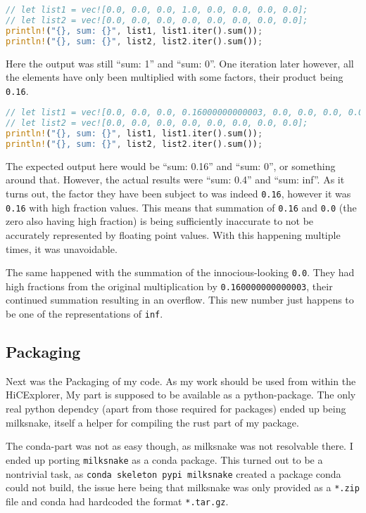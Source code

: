 \vline
\begin{lstlisting}[language=Rust]
// let list1 = vec![0.0, 0.0, 0.0, 1.0, 0.0, 0.0, 0.0, 0.0];
// let list2 = vec![0.0, 0.0, 0.0, 0.0, 0.0, 0.0, 0.0, 0.0];
println!("{}, sum: {}", list1, list1.iter().sum());
println!("{}, sum: {}", list2, list2.iter().sum());
\end{lstlisting}
\vline

Here the output was still ``sum: 1'' and ``sum: 0''. One iteration later however, all the elements have only been multiplied with some factors, their product being \verb|0.16|.

\vline
\begin{lstlisting}[language=Rust]
// let list1 = vec![0.0, 0.0, 0.0, 0.16000000000003, 0.0, 0.0, 0.0, 0.0];
// let list2 = vec![0.0, 0.0, 0.0, 0.0, 0.0, 0.0, 0.0, 0.0];
println!("{}, sum: {}", list1, list1.iter().sum());
println!("{}, sum: {}", list2, list2.iter().sum());
\end{lstlisting}
\vline

The expected output here would be ``sum: 0.16'' and ``sum: 0'', or something
around that. However, the actual results were ``sum: 0.4'' and ``sum: inf''. As
it turns out, the factor they have been subject to was indeed \verb|0.16|,
however it was \verb|0.16| with high fraction values. This means that summation
of \verb|0.16| and \verb|0.0| (the zero also having high fraction) is being
sufficiently inaccurate to not be accurately represented by floating point
values. With this happening multiple times, it was unavoidable.

The same happened with the summation of the innocious-looking \verb|0.0|. They
had high fractions from the original multiplication by
\verb|0.160000000000003|, their continued summation resulting in an overflow.
This new number just happens to be one of the representations of \verb|inf|.


\subsection{Packaging}


Next was the Packaging of my code. As my work should be used from within the
HiCExplorer, My part is supposed to be available as a python-package. The only
real python dependcy (apart from those required for packages) ended up being
milksnake, itself a helper for compiling the rust part of my package.

The conda-part was not as easy though, as milksnake was not resolvable there. I
ended up porting \verb|milksnake| as a conda package. This turned out to be a
nontrivial task, as \verb|conda skeleton pypi milksnake| created a package
conda could not build, the issue here being that milksnake was only provided as
a \verb|*.zip| file and conda had hardcoded the format \verb|*.tar.gz|.

